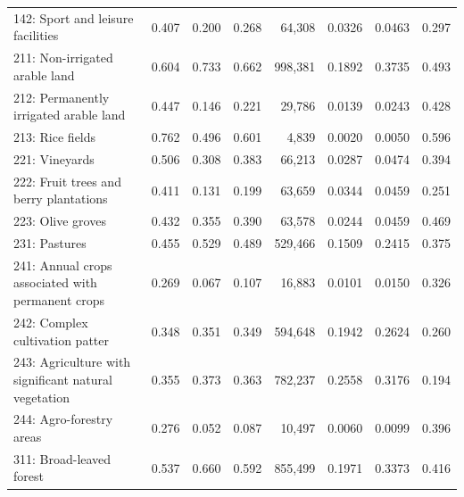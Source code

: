 \begin{table}[!hbt]
{\begin{tabular}{lrrrrrrr}
        142: Sport and leisure facilities                       & 0.407         & 0.200     & 0.268    &  64,308        & 0.0326        & 0.0463        & 0.297 \\
        211: Non-irrigated arable land                          & 0.604         & 0.733     & 0.662    & 998,381        & 0.1892        & 0.3735        & 0.493 \\
        212: Permanently irrigated arable land                  & 0.447         & 0.146     & 0.221    &  29,786        & 0.0139        & 0.0243        & 0.428 \\
        213: Rice fields                                        & 0.762         & 0.496     & 0.601    &   4,839        & 0.0020        & 0.0050        & 0.596 \\
        221: Vineyards                                          & 0.506         & 0.308     & 0.383    &  66,213        & 0.0287        & 0.0474        & 0.394 \\
        222: Fruit trees and berry plantations                  & 0.411         & 0.131     & 0.199    &  63,659        & 0.0344        & 0.0459        & 0.251 \\
        223: Olive groves                                       & 0.432         & 0.355     & 0.390    &  63,578        & 0.0244        & 0.0459        & 0.469 \\
        231: Pastures                                           & 0.455         & 0.529     & 0.489    & 529,466        & 0.1509        & 0.2415        & 0.375 \\
        241: Annual crops associated with permanent crops       & 0.269         & 0.067     & 0.107    &  16,883        & 0.0101        & 0.0150        & 0.326 \\
        242: Complex cultivation patter                         & 0.348         & 0.351     & 0.349    & 594,648        & 0.1942        & 0.2624        & 0.260 \\
        243: Agriculture with significant natural vegetation    & 0.355         & 0.373     & 0.363    & 782,237        & 0.2558        & 0.3176        & 0.194 \\
        244: Agro-forestry areas                                & 0.276         & 0.052     & 0.087    &  10,497        & 0.0060        & 0.0099        & 0.396 \\
        311: Broad-leaved forest                                & 0.537         & 0.660     & 0.592    & 855,499        & 0.1971        & 0.3373        & 0.416 \\

\end{tabular}}
\end{table}
